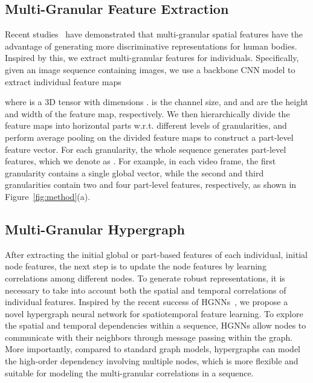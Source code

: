 \documentclass[10pt,twocolumn,letterpaper]{article}
\begin{document}
\subsection{Multi-Granular Feature Extraction}
Recent studies~\cite{DBLP:conf/mm/WangYCLZ18,DBLP:conf/cvpr/ZhengDSJGYHJ19} have demonstrated that multi-granular spatial features have the advantage of generating more discriminative representations for human bodies. Inspired by this, we extract multi-granular features for individuals. Specifically, given an image sequence  containing  images, we use a backbone CNN model to extract individual feature maps

where  is a 3D tensor with dimensions .  is the channel size, and  and  are the height and width of the feature map, respectively. We then hierarchically divide the feature maps into  horizontal parts w.r.t. different levels of granularities, and perform average pooling on the divided feature maps to construct a part-level feature vector. For each granularity, the whole sequence generates  part-level features, which we denote as .
For example, in each video frame, the first granularity contains a single global vector, while the second and third granularities contain two and four part-level features, respectively, as shown in Figure~\ref{fig:method}(a).

\subsection{Multi-Granular Hypergraph}
After extracting the initial global or part-based features of each individual, \ie initial node features, the next step is to update the node features by learning correlations among different nodes. To generate robust representations, it is necessary to take into account both the spatial and temporal correlations of individual features. Inspired by the recent success of HGNNs~\cite{DBLP:conf/aaai/FengYZJG19,DBLP:conf/ijcai/JiangWFCG19}, we propose a novel hypergraph neural network for spatiotemporal feature learning. To explore the spatial and temporal dependencies within a sequence, HGNNs allow nodes to communicate with their neighbors through message passing within the graph. More importantly, compared to standard graph models, hypergraphs can model the high-order dependency involving multiple nodes, which is more flexible and suitable for modeling the multi-granular correlations in a sequence. 
\end{document}
